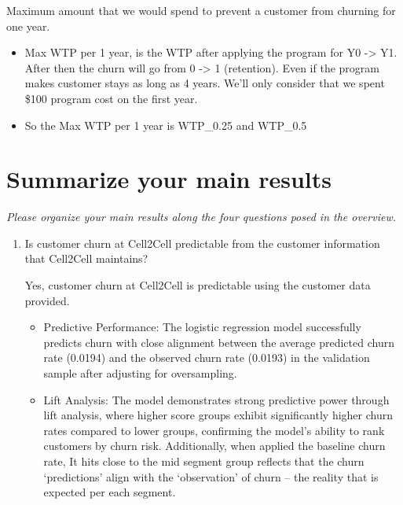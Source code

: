 \documentclass[
]{article}
\begin{document}
Maximum amount that we would spend to prevent a customer from churning
for one year.

\begin{itemize}
\item
  Max WTP per 1 year, is the WTP after applying the program for Y0
  -\textgreater{} Y1. After then the churn will go from 0
  -\textgreater{} 1 (retention). Even if the program makes customer
  stays as long as 4 years. We'll only consider that we spent \$100
  program cost on the first year.
\item
  So the Max WTP per 1 year is WTP\_0.25 and WTP\_0.5
\end{itemize}

\newpage

\section{Summarize your main results}\label{summarize-your-main-results}

\emph{Please organize your main results along the four questions posed
in the overview.}

\begin{enumerate}
\def\labelenumi{\arabic{enumi}.}
\item
  Is customer churn at Cell2Cell predictable from the customer
  information that Cell2Cell maintains?

  Yes, customer churn at Cell2Cell is predictable using the customer
  data provided.

  \begin{itemize}
  \item
    Predictive Performance: The logistic regression model successfully
    predicts churn with close alignment between the average predicted
    churn rate (0.0194) and the observed churn rate (0.0193) in the
    validation sample after adjusting for oversampling.
  \item
    Lift Analysis: The model demonstrates strong predictive power
    through lift analysis, where higher score groups exhibit
    significantly higher churn rates compared to lower groups,
    confirming the model's ability to rank customers by churn risk.
    Additionally, when applied the baseline churn rate, It hits close to
    the mid segment group reflects that the churn `predictions' align
    with the `observation' of churn -- the reality that is expected per
    each segment.
  \end{itemize}
\end{enumerate}
\end{document}
